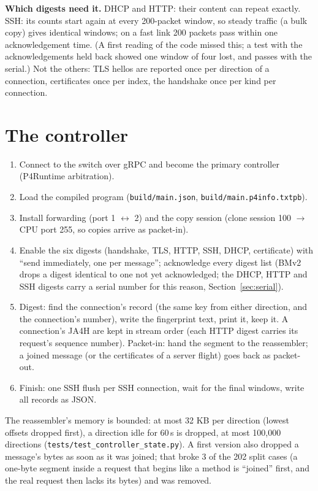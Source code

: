 \documentclass[11pt,a4paper]{article}
\newcommand{\code}[1]{\texttt{#1}}
\begin{document}
\textbf{Which digests need it.} DHCP and HTTP: their content can repeat exactly. SSH: its counts start again at
every 200-packet window, so steady traffic (a bulk copy) gives identical windows; on a fast link 200 packets pass
within one acknowledgement time. (A first reading of the code missed this; a test with the acknowledgements held
back showed one window of four lost, and passes with the serial.) Not the others: TLS hellos are reported once per
direction of a connection, certificates once per index, the handshake once per kind per connection.

\section{The controller}

\begin{enumerate}
\item Connect to the switch over gRPC and become the primary controller (P4Runtime arbitration).
\item Load the compiled program (\code{build/main.json}, \code{build/main.p4info.txtpb}).
\item Install forwarding (port 1 $\leftrightarrow$ 2) and the copy session (clone session 100 $\rightarrow$ CPU port
  255, so copies arrive as packet-in).
\item Enable the six digests (handshake, TLS, HTTP, SSH, DHCP, certificate) with ``send immediately, one per
  message''; acknowledge every digest list (BMv2 drops a digest identical to one not yet acknowledged; the
  DHCP, HTTP and SSH digests carry a serial number for this reason, Section~\ref{sec:serial}).
\item Digest: find the connection's record (the same key from either direction, and the connection's number),
  write the fingerprint text, print it, keep it. A connection's JA4H are kept in stream order (each HTTP digest
  carries its request's sequence number). Packet-in: hand the segment to the reassembler; a joined message (or the certificates of a server
  flight) goes back as packet-out.
\item Finish: one SSH flush per SSH connection, wait for the final windows, write all records as JSON.
\end{enumerate}
The reassembler's memory is bounded: at most 32 KB per direction (lowest offsets dropped first), a direction idle
for 60\,s is dropped, at most 100,000 directions (\code{tests/test\_controller\_state.py}). A first version also
dropped a message's bytes as soon as it was joined; that broke 3 of the 202 split cases (a one-byte segment inside a
request that begins like a method is ``joined'' first, and the real request then lacks its bytes) and was removed.
\end{document}
